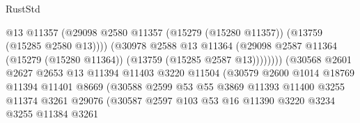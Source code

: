 \begin{lexlean}{RustStd}
\begin{coremodule}
                                            @13
                                            @11357
                                            (@29098
                                              @2580
                                              @11357
                                              (@15279 (@15280 @11357))
                                              (@13759 (@15285 @2580 @13))))
                                          (@30978
                                            @2588
                                            @13
                                            @11364
                                            (@29098
                                              @2587
                                              @11364
                                              (@15279 (@15280 @11364))
                                              (@13759 (@15285 @2587 @13))))))))
                                  (@30568
                                    @2601
                                    @2627
                                    @2653
                                    @13
                                    @11394
                                    @11403
                                    @3220
                                    @11504
                                    (@30579
                                      @2600
                                      @1014
                                      @18769
                                      @11394
                                      @11401
                                      @8669
                                      (@30588
                                        @2599
                                        @53
                                        @55
                                        @3869
                                        @11393
                                        @11400
                                        @3255
                                        @11374
                                        @3261
                                        @29076
                                        (@30587
                                          @2597
                                          @103
                                          @53
                                          @16
                                          @11390
                                          @3220
                                          @3234
                                          @3255
                                          @11384
                                          @3261

\end{coremodule}
\end{lexlean}
